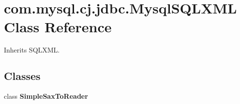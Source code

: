 \hypertarget{classcom_1_1mysql_1_1cj_1_1jdbc_1_1_mysql_s_q_l_x_m_l}{}\section{com.\+mysql.\+cj.\+jdbc.\+Mysql\+S\+Q\+L\+X\+ML Class Reference}
\label{classcom_1_1mysql_1_1cj_1_1jdbc_1_1_mysql_s_q_l_x_m_l}


Inherits S\+Q\+L\+X\+ML.

\subsection*{Classes}
\begin{DoxyCompactItemize}
\item 
class {\bfseries Simple\+Sax\+To\+Reader}
\end{DoxyCompactItemize}
